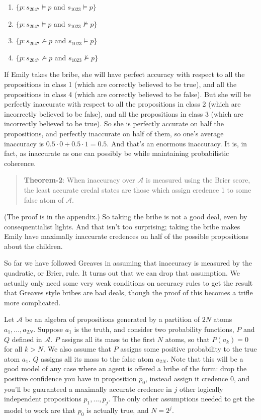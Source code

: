 \begin{enumerate}
\item $\{p: s_{2047} \vDash p$ and $s_{1023} \vDash p\}$

\item $\{p: s_{2047} \vDash p$ and $s_{1023} \nvDash p\}$

\item $\{p: s_{2047} \nvDash p$ and $s_{1023} \vDash p\}$

\item $\{p: s_{2047} \nvDash p$ and $s_{1023} \nvDash p\}$

\end{enumerate}
If Emily takes the bribe, she will have perfect accuracy with respect to all the propositions in class 1 (which are correctly believed to be true), and all the propositions in class 4 (which are correctly believed to be false). But she will be perfectly inaccurate with respect to all the propositions in class 2 (which are incorrectly believed to be false), and all the propositions in class 3 (which are incorrectly believed to be true). So she is perfectly accurate on half the propositions, and perfectly inaccurate on half of them, so one's average inaccuracy is $0.5 \cdot 0 + 0.5 \cdot 1 = 0.5$. And that's an enormous inaccuracy. It is, in fact, as inaccurate as one can possibly be while maintaining probabilistic coherence.

\begin{quote}
\textbf{Theorem-2}: When inaccuracy over $\mathscr{A}$ is measured using the Brier score, the least accurate credal states are those which assign credence 1 to some false atom of $\mathscr{A}$.
\end{quote}
(The proof is in the appendix.) So taking the bribe is not a good deal, even by consequentialist lights. And that isn't too surprising; taking the bribe makes Emily have maximally inaccurate credences on half of the possible propositions about the children.

So far we have followed Greaves in assuming that inaccuracy is measured by the quadratic, or Brier, rule. It turns out that we can drop that assumption. We actually only need some very weak conditions on accuracy rules to get the result that Greaves style bribes are bad deals, though the proof of this becomes a trifle more complicated.

Let $\mathscr{A}$ be an algebra of propositions generated by a partition of $2N$ atoms $a_1, ..., a_{2N}$. Suppose $a_1$ is the truth, and consider two probability functions, $P$ and $Q$ defined in $\mathscr{A}$. $P$ assigns all its mass to the first $N$ atoms, so that $P(a_k) = 0$ for all $k > N$. We also assume that $P$ assigns some positive probability to the true atom $a_1$. $Q$ assigns all its mass to the false atom $a_{2N}$. Note that this will be a good model of any case where an agent is offered a bribe of the form: drop the positive confidence you have in proposition $p_0$, instead assign it credence 0, and you'll be guaranteed a maximally accurate credence in $j$ other logically independent propositions $p_1, ..., p_j$. The only other assumptions needed to get the model to work are that $p_0$ is actually true, and $N = 2^j$.

